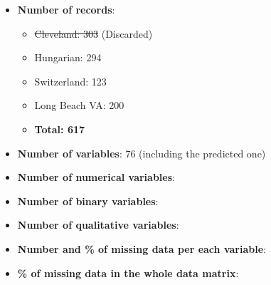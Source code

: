 \documentclass[a4paper,12pt]{article}
\begin{document}
    \begin{itemize}

        \item \textbf{Number of records}:
        \begin{itemize}

            \item \st{Cleveland: 303} (Discarded)
            \item Hungarian: 294
            \item Switzerland: 123
            \item Long Beach VA: 200
            \item \textbf{Total: 617}

        \end{itemize}
        \item \textbf{Number of variables}: 76 (including the predicted one)
        \item \textbf{Number of numerical variables}:
        \item \textbf{Number of binary variables}:
        \item \textbf{Number of qualitative variables}:
        \item \textbf{Number and \% of missing data per each variable}:
        \item \textbf{\% of missing data in the whole data matrix}:

    \end{itemize}
\end{document}
